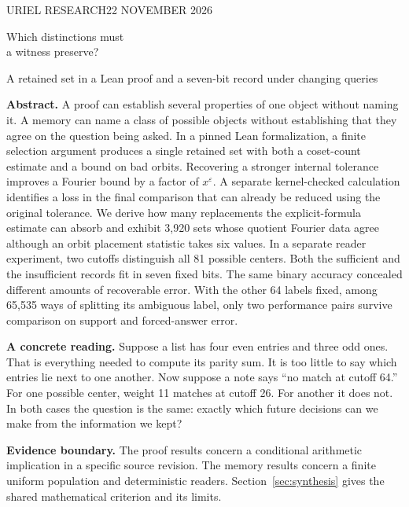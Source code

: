 \documentclass[11pt,letterpaper]{article}
\begin{document}
\thispagestyle{plain}
{\sffamily\small\color{teal}URIEL RESEARCH\hfill 22 NOVEMBER 2026}\par
\vspace{12pt}
{\Huge\bfseries\color{ink}\raggedright Which distinctions must\\a witness preserve?\par}
\vspace{5pt}
{\Large\color{quiet}A retained set in a Lean proof and a seven-bit record under changing queries}\par
\vspace{8pt}
\textbf{Abstract.}
A proof can establish several properties of one object without naming it. A memory can name a class of possible objects without establishing that they agree on the question being asked. In a pinned Lean formalization, a finite selection argument produces a single retained set with both a coset-count estimate and a bound on bad orbits. Recovering a stronger internal tolerance improves a Fourier bound by a factor of \(x^\varepsilon\). A separate kernel-checked calculation identifies a loss in the final comparison that can already be reduced using the original tolerance. We derive how many replacements the explicit-formula estimate can absorb and exhibit 3,920 sets whose quotient Fourier data agree although an orbit placement statistic takes six values. In a separate reader experiment, two cutoffs distinguish all 81 possible centers. Both the sufficient and the insufficient records fit in seven fixed bits. The same binary accuracy concealed different amounts of recoverable error. With the other 64 labels fixed, among 65,535 ways of splitting its ambiguous label, only two performance pairs survive comparison on support and forced-answer error.

\smallskip\textbf{A concrete reading.}
Suppose a list has four even entries and three odd ones. That is everything needed to compute its parity sum. It is too little to say which entries lie next to one another. Now suppose a note says “no match at cutoff 64.” For one possible center, weight 11 matches at cutoff 26. For another it does not. In both cases the question is the same: exactly which future decisions can we make from the information we kept?

\smallskip\textbf{Evidence boundary.}
The proof results concern a conditional arithmetic implication in a specific source revision. The memory results concern a finite uniform population and deterministic readers. Section~\ref{sec:synthesis} gives the shared mathematical criterion and its limits.
\smallskip
{\small\tableofcontents}
\clearpage
\end{document}
